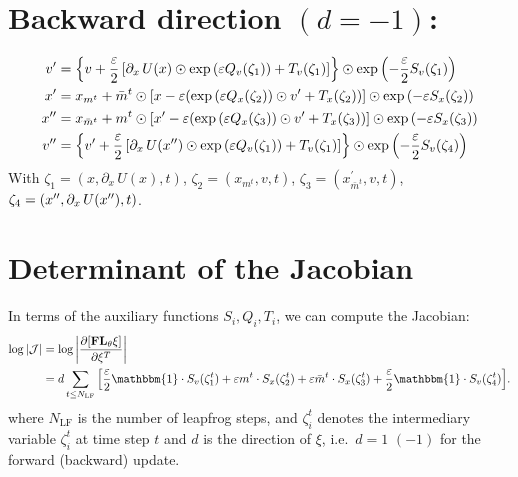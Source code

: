 \documentclass[../main.tex]{subfiles}
\begin{document}
\section{Backward direction \texorpdfstring{$(d = -1)$}{(d = -1)}:}%
\label{sec:lf_backward}
%
\begin{align}
  v^{\prime} &= {\left\{v + \frac{\eps}{2}\left[\partial_{x}\,U(x)\odot
        \exp{\left(\eps Q_{v}(\zeta_{1})\right)}%
    + T_{v}(\zeta_{1})\right]\right\}} \odot
    \exp{\left(-\frac{\eps}{2}S_{v}(\zeta_{1})\right)} \\
  \xp &= x_{m^{t}} + \bar{m}^{t}\odot%
    {\left[x - \eps{\left(\exp{\left(\eps Q_{x}(\zeta_{2})\right)}\odot \vp%
    + T_{x}(\zeta_{2})\right)}\right]}\odot \exp{\left(-\eps
    S_{x}(\zeta_{2})\right)} \\ 
  \xpp &= x_{\bar{m}^{t}} + m^{t}\odot%
    {\left[\xp - \eps{\left(\exp{\left(\eps Q_{x}(\zeta_{3})\right)}\odot \vp%
    + T_{x}(\zeta_{3})\right)}\right]}\odot \exp{\left(-\eps
    S_{x}(\zeta_{3})\right)} \\
  v^{\prime\prime} &= {\left\{\vp +
      \frac{\eps}{2}\left[\partial_{x}\,U(\xpp)\odot%
        \exp{\left(\eps Q_{v}(\zeta_{1})\right)}
  + T_{v}(\zeta_{1})\right]\right\}}\odot 
    \exp{\left(-\frac{\eps}{2}S_{v}(\zeta_{4})\right)}
\end{align}
%
With $\zeta_{1} = (x, \partial_{x}\, U(x), t)$, $\zeta_{2} = (x_{m^{t}}, v,
t)$, $\zeta_{3} = (x^{\prime}_{\bar{m}^{t}}, v, t)$, $\zeta_{4} = ({x^{\prime\prime}},
\partial_{x}\, U({x^{\prime\prime}}), t)$.
%
\section{Determinant of the Jacobian}
In terms of the auxiliary functions $S_{i}, Q_{i}, T_{i}$, we can compute the
Jacobian:
%
\begin{align}
  \log|\mathcal{J}| 
  &= \log\bigg|\frac{\partial{\left[\mathbf{FL}_{\theta}\xi\right]}}{\partial
  \xi^{T}}\bigg|\\
  &= d \sum_{t\leq N_{\mathrm{LF}}}
    {\left[\frac{\eps}{2} \mathbbm{1}\cdot S_{v}(\zeta_{1}^{t}) + \eps m^{t}
        \cdot S_{x}(\zeta_{2}^{t}) 
      + \eps \bar{m}^{t} \cdot S_{x}(\zeta_{3}^{t}) + \frac{\eps}{2}\mathbbm{1}
\cdot S_{v}(\zeta_{4}^{t})\right]}.  \end{align}
%
where $N_{\mathrm{LF}}$ is the number of leapfrog steps, and $\zeta_{i}^{t}$
denotes the intermediary variable $\zeta_{i}^{t}$ at time step $t$ and $d$ is
the direction of $\xi$, i.e.\ $d = 1 \,\, (-1)$ for the forward (backward)
update.
%
\end{document}
